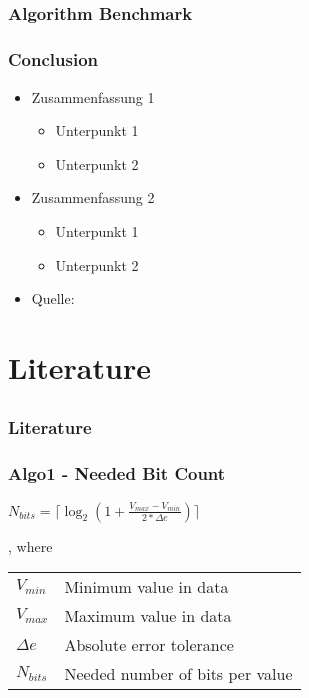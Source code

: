\documentclass[compress]{beamer}
\begin{document}
\subsection*{}

\begin{frame}
	\frametitle{Algorithm Benchmark}

\end{frame}

\begin{frame}
	\frametitle{Conclusion}

	\begin{itemize}
		\item Zusammenfassung 1
		\begin{itemize}
			\item Unterpunkt 1
			\item Unterpunkt 2
		\end{itemize}
		\item Zusammenfassung 2
		\begin{itemize}
			\item Unterpunkt 1
			\item Unterpunkt 2
		\end{itemize}
		\item Quelle: \cite{Quelle2012}
	\end{itemize}
\end{frame}

\section{Literature}
\subsection*{}

\begin{frame}
	\frametitle{Literature}

	
	
\end{frame}

\appendix

\begin{frame}
	\frametitle{Algo1 - Needed Bit Count}

	\begin{center}
		$N_{bits}=\lceil\log_2{\left(1 + \frac{V_{max} - V_{min}}{2 * \Delta{e}}\right)}\rceil$
	\end{center}

	\bigskip

	, where\\

	\bigskip

	\begin{tabular}{ll}
		$V_{min}$ & Minimum value in data \\
		$V_{max}$ & Maximum value in data \\
		$\Delta{e}$ & Absolute error tolerance \\
		$N_{bits}$ & Needed number of bits per value
	\end{tabular}

\end{frame}
\end{document}
